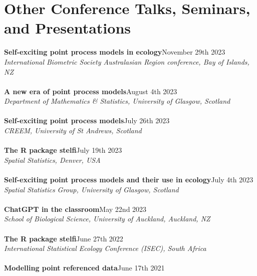 \documentclass[10pt,letter]{article}
\begin{document}
\section*{Other Conference Talks, Seminars, and Presentations}
\vspace{1mm}
{\textbf{Self-exciting point process models in ecology}}\hfill November 29th 2023\\
                 {\sl  International Biometric Society Australasian Region conference, Bay of Islands, NZ}\\
                 \hdashrule[0.5ex]{4cm}{1pt}{1pt}\\
{\textbf{A new era of point process models}}\hfill August 4th 2023\\
                 {\sl Department of Mathematics \& Statistics, University of Glasgow, Scotland}\\
                 \hdashrule[0.5ex]{4cm}{1pt}{1pt}\\
{\textbf{Self-exciting point process models}}\hfill July 26th 2023\\
                 {\sl CREEM, University of St Andrews, Scotland }\\
                 \hdashrule[0.5ex]{4cm}{1pt}{1pt}\\
 {\textbf{The R package stelfi}}\hfill July 19th 2023\\
                 {\sl  Spatial Statistics, Denver, USA}\\
                 \hdashrule[0.5ex]{4cm}{1pt}{1pt}\\
{\textbf{Self-exciting point process models and their use in ecology}}\hfill July 4th 2023\\
                 {\sl Spatial Statistics Group, University of Glasgow, Scotland}\\
                 \hdashrule[0.5ex]{4cm}{1pt}{1pt}\\
                 {\textbf{ChatGPT in the classroom}}\hfill May 22nd 2023\\
                 {\sl  School of Biological Science, University of Auckland, Auckland, NZ}\\
                 \hdashrule[0.5ex]{4cm}{1pt}{1pt}\\
                 {\textbf{The R package stelfi}}\hfill June 27th 2022\\
                 {\sl  International Statistical Ecology Conference (ISEC), South Africa}\\
                 \hdashrule[0.5ex]{4cm}{1pt}{1pt}\\
                  {\textbf{Modelling point referenced data}}\hfill June 17th 2021\\
\end{document}
